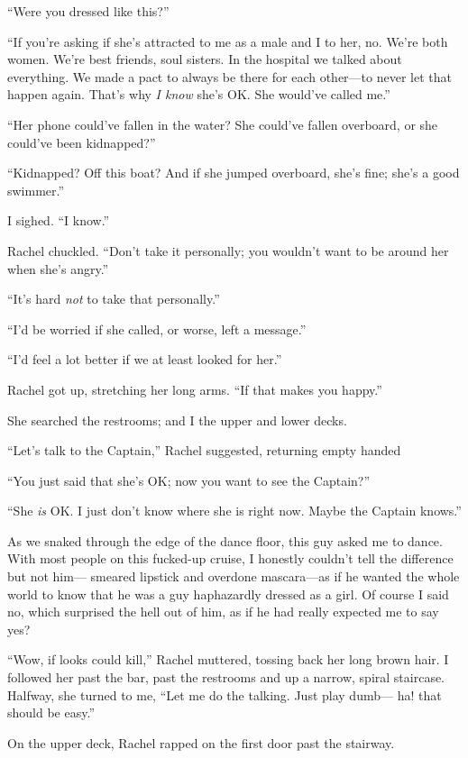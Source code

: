 ``Were you dressed like this?''

``If you're asking if she's attracted to me as a male and I to her, no.
We're both women. We're best friends, soul sisters. In the hospital we
talked about everything. We made a pact to always be there for each
other---to never let that happen again. That's why \emph{I know} she's
OK. She would've called me.''

``Her phone could've fallen in the water? She could've fallen overboard,
or she could've been kidnapped?''

``Kidnapped? Off this boat? And if she jumped overboard, she's fine;
she's a good swimmer.''

I sighed. ``I know.''

Rachel chuckled. ``Don't take it personally; you wouldn't want to be
around her when she's angry.''

``It's hard \emph{not} to take that personally.''

``I'd be worried if she called, or worse, left a message.''

``I'd feel a lot better if we at least looked for her.''

Rachel got up, stretching her long arms. ``If that makes you happy.''

She searched the restrooms; and I the upper and lower decks.

``Let's talk to the Captain,'' Rachel suggested, returning empty handed

``You just said that she's OK; now you want to see the Captain?''

``She \emph{is} OK. I just don't know where she is right now. Maybe the
Captain knows.''

As we snaked through the edge of the dance floor, this guy asked me to
dance. With most people on this fucked-up cruise, I honestly couldn't
tell the difference but not him--- smeared lipstick and overdone
mascara---as if he wanted the whole world to know that he was a guy
haphazardly dressed as a girl. Of course I said no, which surprised the
hell out of him, as if he had really expected me to say yes?

``Wow, if looks could kill,'' Rachel muttered, tossing back her long
brown hair. I followed her past the bar, past the restrooms and up a
narrow, spiral staircase. Halfway, she turned to me, ``Let me do the
talking. Just play dumb--- ha! that should be easy.''

On the upper deck, Rachel rapped on the first door past the stairway.

